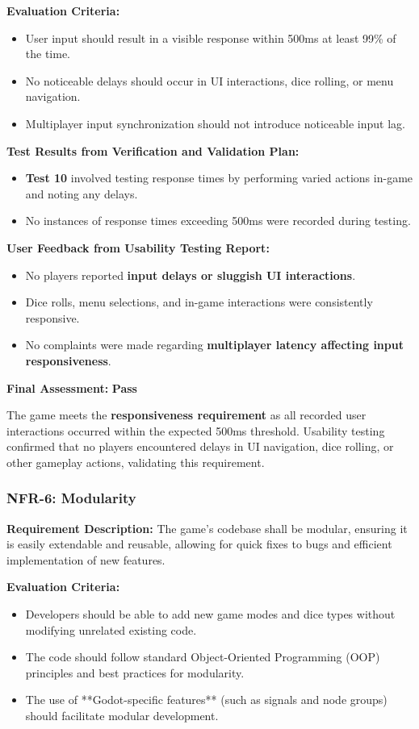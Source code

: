\documentclass[12pt, titlepage]{article}
\begin{document}
\textbf{Evaluation Criteria:}  
\begin{itemize}
    \item User input should result in a visible response within 500ms at least 99\% of the time.
    \item No noticeable delays should occur in UI interactions, dice rolling, or menu navigation.
    \item Multiplayer input synchronization should not introduce noticeable input lag.
\end{itemize}

\textbf{Test Results from Verification and Validation Plan:}  
\begin{itemize}
    \item \textbf{Test 10} involved testing response times by performing varied actions in-game and noting any delays.
    \item No instances of response times exceeding 500ms were recorded during testing.
\end{itemize}

\textbf{User Feedback from Usability Testing Report:}  
\begin{itemize}
    \item No players reported \textbf{input delays or sluggish UI interactions}.
    \item Dice rolls, menu selections, and in-game interactions were consistently responsive.
    \item No complaints were made regarding \textbf{multiplayer latency affecting input responsiveness}.
\end{itemize}

\textbf{Final Assessment:} \textbf{Pass}  

The game meets the \textbf{responsiveness requirement} as all recorded user interactions occurred within the expected 500ms threshold. Usability testing confirmed that no players encountered delays in UI navigation, dice rolling, or other gameplay actions, validating this requirement.


\subsubsection{NFR-6: Modularity}

\textbf{Requirement Description:}  
The game’s codebase shall be modular, ensuring it is easily extendable and reusable, allowing for quick fixes to bugs and efficient implementation of new features.

\textbf{Evaluation Criteria:}  
\begin{itemize}
    \item Developers should be able to add new game modes and dice types without modifying unrelated existing code.
    \item The code should follow standard Object-Oriented Programming (OOP) principles and best practices for modularity.
    \item The use of **Godot-specific features** (such as signals and node groups) should facilitate modular development.
\end{itemize}
\end{document}
